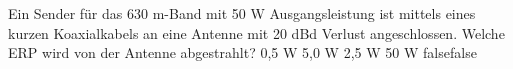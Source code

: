     {Ein Sender für das 630 m-Band mit 50 W Ausgangsleistung ist mittels eines kurzen Koaxialkabels an eine Antenne mit 20 dBd Verlust angeschlossen. Welche ERP wird von der Antenne abgestrahlt?}
    {0,5 W}
    {5,0 W}
    {2,5 W}
    {50 W}
    {false}{false}